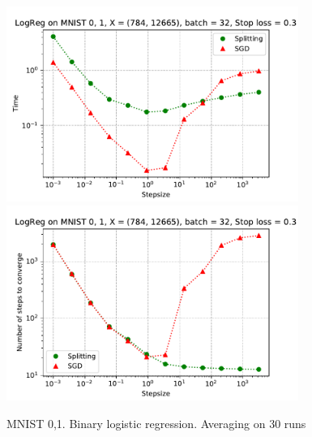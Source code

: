 \documentclass{article} %
\begin{document}
\begin{figure}
\includegraphics[width=0.85\textwidth]{sgd_split_iterations_logreg.pdf} \\
\includegraphics[width=0.85\textwidth]{sgd_split_time_logreg.pdf}

\caption{MNIST 0,1. Binary logistic regression. Averaging on 30 runs}
\end{figure}

\newpage



\end{document}

